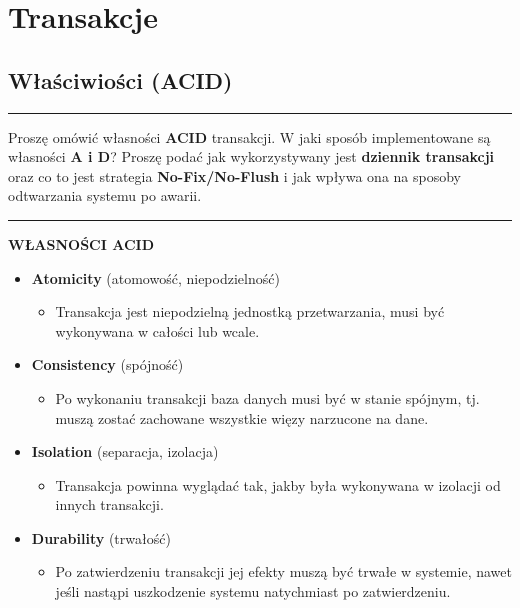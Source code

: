 \documentclass[a5paper,6pt]{article}
\newcommand{\horrule}[1]{\rule{\linewidth}{#1}}
\begin{document}

    \section{Transakcje} %
    \label{sec:transakcje}

    \subsection{Właściwiości (ACID)} %
    \label{sub:wlasciwiosci}

    \horrule{0.5pt}
     Proszę omówić własności \textbf{ACID} transakcji. W jaki sposób
          implementowane są własności \textbf{A i D}? Proszę podać jak
          wykorzystywany jest \textbf{dziennik transakcji} oraz co to jest
          strategia \textbf{No-Fix/No-Flush} i jak wpływa ona na sposoby
          odtwarzania systemu po awarii.\\
    \horrule{0.5pt}

    \textbf{WŁASNOŚCI ACID}
    \begin{itemize}
        \item \textbf{Atomicity} (atomowość, niepodzielność)
        \begin{itemize}
            \item Transakcja jest niepodzielną jednostką przetwarzania, musi
                  być wykonywana w całości lub wcale.
        \end{itemize}

        \item \textbf{Consistency} (spójność)
        \begin{itemize}
            \item Po wykonaniu transakcji baza danych musi być w stanie spójnym,
                  tj. muszą zostać zachowane wszystkie więzy narzucone na dane.
        \end{itemize}

        \item \textbf{Isolation} (separacja, izolacja)
        \begin{itemize}
            \item Transakcja powinna wyglądać tak, jakby była wykonywana w
                  izolacji od innych transakcji.
        \end{itemize}

        \item \textbf{Durability} (trwałość)
        \begin{itemize}
            \item Po zatwierdzeniu transakcji jej efekty muszą być trwałe w
                  systemie, nawet jeśli nastąpi uszkodzenie systemu natychmiast
                  po zatwierdzeniu.
        \end{itemize}

    \end{itemize}
\end{document}
